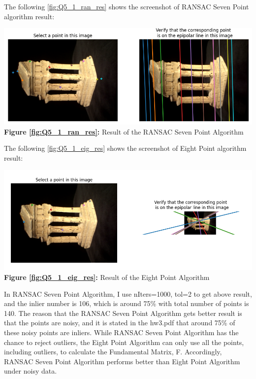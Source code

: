 \begin{your_solution}[title=Q5.1,height=20.5cm,width=\linewidth]
The following \autoref{fig:Q5_1_ran_res} shows the screenshot of RANSAC Seven Point algorithm result:
\newline

\begin{minipage}{1\linewidth}
	\centering
	\includegraphics[width=1\linewidth, height=0.39\columnwidth]{../Q5_1_ransac_seven_result.png}
	\textbf{Figure \ref{fig:Q5_1_ran_res}:} Result of the RANSAC Seven Point Algorithm  %
	\label{fig:Q5_1_ran_res}         %
\end{minipage}
\newline

The following \autoref{fig:Q5_1_eig_res} shows the screenshot of Eight Point algorithm result:
\newline

\begin{minipage}{1\linewidth}
	\centering
	\includegraphics[width=1\linewidth, height=0.39\columnwidth]{../Q5_1_eight_result.png}
	\textbf{Figure \ref{fig:Q5_1_eig_res}:} Result of the Eight Point Algorithm  %
	\label{fig:Q5_1_eig_res}         %
\end{minipage}
\newline

In RANSAC Seven Point Algorithm, I use nIters=1000, tol=2 to get above result, and the inlier number is 106, which is around 75\% with total number of points is 140. The reason that the RANSAC Seven Point Algorithm gets better result is that the points are noisy, and it is stated in the hw3.pdf that around 75\% of these noisy points are inliers. While RANSAC Seven Point Algorithm has the chance to reject outliers, the Eight Point Algorithm can only use all the points, including outliers, to calculate the Fundamental Matrix, F. Accordingly, RANSAC Seven Point Algorithm performs better than Eight Point Algorithm under noisy data.

\end{your_solution}

